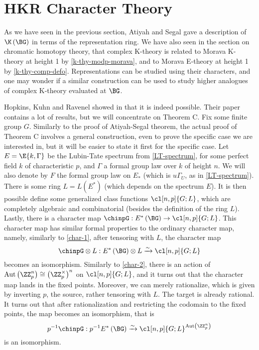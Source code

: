 \section{HKR Character Theory}

As we have seen in the previous section, Atiyah and Segal gave a description of $\K\left(\BG\right)$ in terms of the representation ring.
We have also seen in the section on chromatic homotopy theory, that complex K-theory is related to Morava K-theory at height 1 by \ref{k-thy-modp-morava}, and to Morava E-theory at height 1 by \ref{k-thy-comp-defo}.
Representations can be studied using their characters, and one may wonder if a similar construction can be used to study higher analogues of complex K-theory evaluated at $\BG$.

Hopkins, Kuhn and Ravenel showed in \cite{HKR} that it is indeed possible.
Their paper contains a lot of results, but we will concentrate on Theorem C.
Fix some finite group $G$.
Similarly to the proof of Atiyah-Segal theorem, the actual proof of Theorem C involves a general construction, even to prove the specific case we are interested in, but it will be easier to state it first for the specific case.
Let $E = \E{k, \Gamma}$ be the Lubin-Tate spectrum from \ref{LT-spectrum}, for some perfect field $k$ of characteristic $p$, and $\Gamma$ a formal group law over $k$ of height $n$.
We will also denote by $F$ the formal group law on $E_*$ (which is $u \Gamma_U$, as in \ref{LT-spectrum}).
There is some ring $L = L\left(E^*\right)$ (which depends on the spectrum $E$).
It is then possible define some generalized class functions $\cl[n,p]{G; L}$, which are completely algebraic and combinatorial (besides the definition of the ring $L$).
Lastly, there is a character map $\chinpG: E^*\left(\BG\right) \to \cl[n,p]{G; L}$.
This character map has similar formal properties to the ordinary character map, namely, similarly to \ref{char-1}, after tensoring with $L$, the character map
$$
\chinpG \otimes L:
E^*\left(\BG\right) \otimes L
\xrightarrow{\sim} \cl[n,p]{G; L}
$$
becomes an isomorphism.
Similarly to \ref{char-2}, there is an action of $\aut\left(\ZZ_p^n\right) \cong \left(\ZZ_p^\times\right)^n$ on $\cl[n,p]{G; L}$, and it turns out that the character map lands in the fixed points.
Moreover, we can merely rationalize, which is given by inverting $p$, the source, rather tensoring with $L$.
The target is already rational.
It turns out that after rationalization and restricting the codomain to the fixed points, the map becomes an isomorphism, that is
$$
p^{-1} \chinpG:
p^{-1} E^*\left(\BG\right)
\xrightarrow{\sim} \cl[n,p]{G; L}^{\aut\left(\ZZ_p^n\right)}
$$
is an isomorphism.

